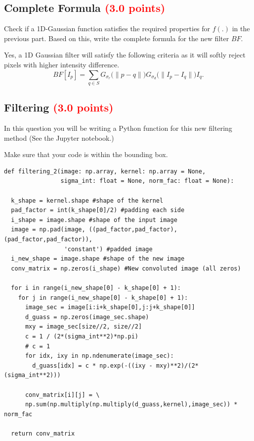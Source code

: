 \documentclass[answers]{exam}
\newcommand{\mypoints}[1]{\textcolor{red}{(#1 points)}}
\begin{document}
\subsection{Complete Formula \mypoints{3.0}} \label{sssec:focallength}
Check if a 1D-Gaussian function satisfies the required properties for $f(.)$ in the previous part. Based on this, write the complete formula for the new filter $BF$.
\begin{solution}
Yes, a 1D Gaussian filter will satisfy the following criteria as it will softly reject pixels with higher intensity difference.\\
$$BF[I_p] = \sum_{q \in S} G_{\sigma_r}\big(\|p-q\|\big)G_{\sigma_d} \big(\|I_{p}-I_{q}\|\big)I_q.$$
\end{solution}
    
\subsection{Filtering \mypoints{3.0}}
In this question you will be writing a Python function for this new filtering method (See the Jupyter notebook.)

Make sure that your code is within the bounding box.
\begin{solution}
\begin{verbatim}
def filtering_2(image: np.array, kernel: np.array = None, 
                sigma_int: float = None, norm_fac: float = None):

  k_shape = kernel.shape #shape of the kernel
  pad_factor = int(k_shape[0]/2) #padding each side
  i_shape = image.shape #shape of the input image
  image = np.pad(image, ((pad_factor,pad_factor),(pad_factor,pad_factor)), 
                 'constant') #padded image
  i_new_shape = image.shape #shape of the new image
  conv_matrix = np.zeros(i_shape) #New convoluted image (all zeros)

  for i in range(i_new_shape[0] - k_shape[0] + 1):
    for j in range(i_new_shape[0] - k_shape[0] + 1):
      image_sec = image[i:i+k_shape[0],j:j+k_shape[0]]
      d_guass = np.zeros(image_sec.shape)
      mxy = image_sec[size//2, size//2]
      c = 1 / (2*(sigma_int**2)*np.pi)
      # c = 1
      for idx, ixy in np.ndenumerate(image_sec):
        d_guass[idx] = c * np.exp(-((ixy - mxy)**2)/(2*(sigma_int**2)))

      conv_matrix[i][j] = \
      np.sum(np.multiply(np.multiply(d_guass,kernel),image_sec)) * norm_fac

  return conv_matrix

\end{verbatim}
\end{solution}
\end{document}
